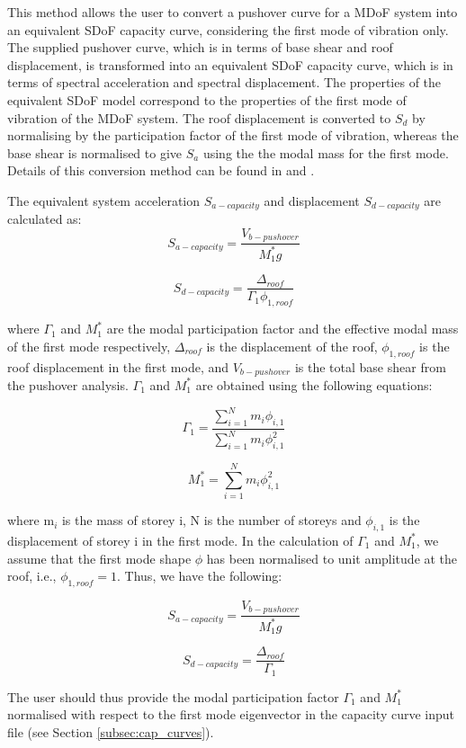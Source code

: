 This method allows the user to convert a pushover curve for a MDoF system into an equivalent SDoF capacity curve, considering the first mode of vibration only. The supplied pushover curve, which is in terms of base shear and roof displacement, is transformed into an equivalent SDoF capacity curve, which is in terms of spectral acceleration and spectral displacement. The properties of the equivalent SDoF model correspond to the properties of the first mode of vibration of the MDoF system. The roof displacement is converted to $S_d$ by normalising by the participation factor of the first mode of vibration, whereas the base shear is normalised to give $S_a$ using the the modal mass for the first mode. Details of this conversion method can be found in \citet{ATC1996} and \citet{FEMA4402005}.

The equivalent system acceleration $S_{a-capacity}$ and displacement $S_{d-capacity}$ are calculated as:
\begin{equation}
	S_{a-capacity} = \frac{V_{b-pushover}}{M_{1}^{*} g}
\end{equation}

\begin{equation}
	S_{d-capacity} = \frac{\Delta_{roof}}{\Gamma_{1} \phi_{1, roof}}
\end{equation}

where $\Gamma_{1}$ and $M_{1}^{*}$ are the modal participation factor and the effective modal mass of the first mode respectively, $\Delta_{roof}$ is the displacement of the roof, $\phi_{1, roof}$ is the roof displacement in the first mode, and $V_{b-pushover}$ is the total base shear from the pushover analysis. $\Gamma_{1}$ and $M_{1}^{*}$ are obtained using the following equations:

\begin{equation}
	\Gamma_{1} = \frac{\sum_{i=1}^{N} m_i \phi_{i,1}}{\sum_{i=1}^{N} m_i \phi_{i,1}^2}
\end{equation}

\begin{equation}
	M_{1}^{*} = \sum_{i=1}^{N} m_i \phi_{i,1}^2
\end{equation}

where m$_i$ is the mass of storey i, N is the number of storeys and $\phi_{i,1}$ is the displacement of storey i in the first mode. In the calculation of $\Gamma_1$ and $M_{1}^{*} $, we assume that the first mode shape $\phi$ has been normalised to unit amplitude at the roof, i.e., $\phi_{1, roof} = 1$. Thus, we have the following:

\begin{equation}
	S_{a-capacity} = \frac{V_{b-pushover}}{M_{1}^{*} g}
\end{equation}

\begin{equation}
	S_{d-capacity} = \frac{\Delta_{roof}}{\Gamma_1}
\end{equation}

The user should thus provide the modal participation factor $\Gamma_1$ and $M_{1}^{*} $ normalised with respect to the first mode eigenvector in the capacity curve input file (see Section \ref{subsec:cap_curves}).